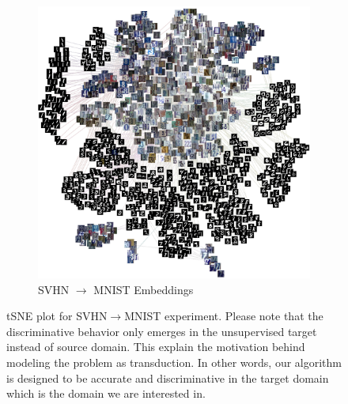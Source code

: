 \begin{figure}[ht]
    \label{fig:tsne}
    \begin{subfigure}[b]{\textwidth}
        \includegraphics[width=\textwidth]{out_im.png}
        \vspace{-5mm}
        \caption{SVHN $\rightarrow$ MNIST Embeddings}
        \label{fig:tsnedigit}
    \end{subfigure}
    
\caption{tSNE plot for SVHN$\rightarrow$MNIST experiment. Please note that the discriminative behavior only emerges in the unsupervised target instead of source domain. This explain the motivation behind modeling the problem as transduction. In other words, our algorithm is designed to be accurate and discriminative in the target domain which is the domain we are interested in.  }
\label{fig:tsne}
\end{figure}
